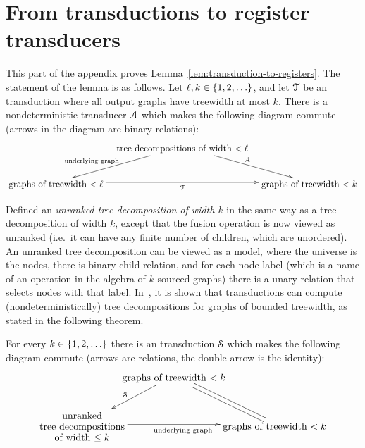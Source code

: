 \section{From transductions to register transducers}
\label{sec:transductions-to-transducers}
This part of the appendix proves Lemma~\ref{lem:transduction-to-registers}. The statement of the lemma is as follows. 
    Let $\ell, k \in \{1,2,\ldots\}$, and  let ${\mathcal T}$ be an \mso transduction where all output graphs have treewidth at most $k$. There is a nondeterministic  transducer ${\mathcal A}$ which makes the following diagram commute (arrows in the diagram are binary relations):
    \begin{align*}
    \xymatrix@C=0.3cm{
         & \txt{tree decompositions of width $< \ell$}
        \ar[dl]_-{\txt{\scriptsize underlying graph \qquad \qquad}}
         \ar[dr]^\Aa\\
        \txt{graphs of treewidth $< \ell$}\ar[rr]_\Tt & &
        \txt{graphs  of treewidth $< k$} 
    }
    \end{align*}


Defined an \emph{unranked tree decomposition of width $k$} in the same way as a tree decomposition of width $k$, except that the fusion operation is now viewed as unranked (i.e.~it can have any finite number of children, which are unordered). An unranked tree decomposition can be viewed as a model, where the universe is the nodes, there is binary child relation, and for each  node label (which is a name of an operation in the algebra of $k$-sourced graphs) there is a unary relation that selects nodes with that label.  In~\cite[Corollary 3]{bojanczykOptimizingTreeDecompositions2017a}, it is shown that \mso transductions can compute (nondeterministically) tree decompositions for graphs of bounded treewidth, as stated in the following theorem.
 
\begin{theorem}\label{thm:boj-pil}
    For every $k \in \{1,2,\ldots\}$ there is an \mso transduction ${\mathcal S}$ which makes the following diagram commute (arrows are relations, the double arrow is the identity):
    \begin{align*}
        \xymatrix@C=-0.3cm{ 
              & \txt{graphs of treewidth $<k$}
             \ar[dl]_{\Ss}
             \ar@{-}@<-.5ex>[dr] \ar@{-}@<.5ex>[dr]
             \\
            \txt{unranked\\ tree decompositions\\
            of width $\le k$} 
            \ar[rr]_-{\text{ \qquad underlying graph}}
             & & \txt{graphs of treewidth $<k$}
        }
    \end{align*}
\end{theorem}

